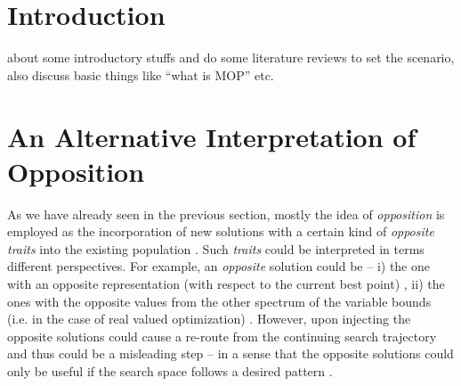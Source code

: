 \documentclass[journal]{IEEEtran}
\begin{document}
\section{Introduction}
% 
% 
% 
% 

 about some introductory stuffs and do some literature reviews to set the scenario, also discuss basic things like ``what is MOP'' etc. 


 

\section{An Alternative Interpretation of Opposition}
\label{sec:alternative-interpretation}
As we have already seen in the previous section, mostly the idea of \textit{opposition} is employed as the incorporation of new solutions with a certain kind of \textit{opposite traits} into the existing population \cite{?}. Such \textit{traits} could be interpreted in terms different perspectives. For example, an \textit{opposite} solution could be -- i) the one with an opposite representation (with respect to the current best point) \cite{?}, ii) the ones with the opposite values from the other spectrum of the variable bounds (i.e. in the case of real valued optimization) \cite{?}. However, upon injecting the opposite solutions could cause a re-route from the continuing search trajectory and thus could be a misleading step -- in a sense that the opposite solutions could only be useful if the search space follows a desired pattern \cite{?}. 
\end{document}
